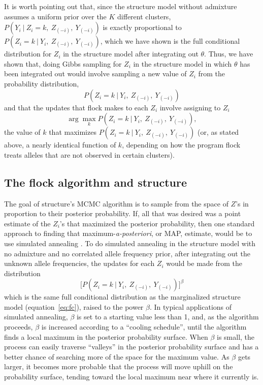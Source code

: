It is worth pointing out that, since the
{\sc structure} model without admixture assumes a uniform prior over 
the $K$ different clusters, $P(Y_{i}~|~Z_i=k,~Z_{(-i)},~Y_{(-i)})$
is exactly proportional to $P(Z_i=k~|~Y_i, ~Z_{(-i)},~Y_{(-i)})$, which 
we have shown is the
full conditional distribution for $Z_i$ in the {\sc structure} model after
integrating out $\theta$.  Thus, we have shown that, doing Gibbs
sampling for $Z_i$ in  the {\sc structure} model in which $\theta$ has been
integrated out would involve sampling a new value of $Z_i$ from the 
probability distribution,
\[
P(Z_i=k~|~Y_i, ~Z_{(-i)},~Y_{(-i)})
\]
and that the updates that
{\sc flock} makes to each $Z_i$ involve assigning to $Z_i$
\begin{equation}
\arg\max_k P(Z_i=k~|~Y_i, ~Z_{(-i)},~Y_{(-i)}),
\end{equation}
\ie the value of $k$ that maximizes $P(Z_i=k~|~Y_i, ~Z_{(-i)},~Y_{(-i)})$
(or, as stated above, a nearly identical function of $k$, depending on how
the program {\sc flock} treats alleles that are not observed in certain clusters).



\subsection*{The {\sc flock} algorithm and {\sc structure}}
The goal of {\sc structure}'s MCMC algorithm is to sample from the space of 
$Z$'s in proportion to their posterior probability.  If, all that was desired
was a point estimate of the $Z_i$'s that maximized the posterior probability,
then one standard approach to finding that maximum-{\em a-posteriori}, or MAP, 
estimate, would be to use simulated annealing \citep{Kirkpatricketal1983}.
To do simulated annealing in the {\sc structure} model with no admixture and
no correlated allele frequency prior, after integrating out the unknown
allele frequencies, the updates for each $Z_i$ would be made from the 
distribution
\[
\biggl[P(Z_i=k~|~Y_i, ~Z_{(-i)},~Y_{(-i)})\biggr]^\beta
\]
which is the same full conditional distribution as the marginalized {\sc structure}
model (equation~\ref{eq:fc}), raised
to the power $\beta$.  In typical applications of simulated annealing,
$\beta$ is set to a starting value less than 1, and, as the algorithm proceeds,
$\beta$ is increased according to a ``cooling schedule''\citep{Hajek1988}, until
the algorithm finds a local maximum in the posterior probability surface.  
When $\beta$ is small, the process can easily traverse ``valleys''
in the posterior probability surface and has a better chance of searching
more of the space for the maximum value.  As $\beta$ gets larger, it becomes
more probable that the process will
move uphill on the probability surface, tending toward the local
maximum near where it currently is.    

